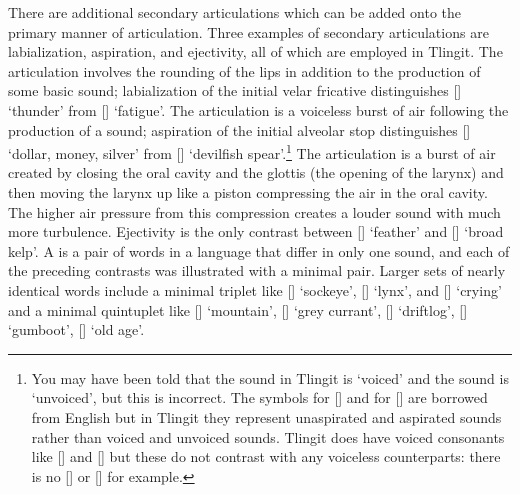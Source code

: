 There are additional secondary articulations which can be added onto the primary manner of articulation. Three examples of secondary articulations are labialization, aspiration, and ejectivity, all of which are employed in Tlingit. The  articulation involves the rounding of the lips in addition to the production of some basic sound; labialization of the initial velar fricative distinguishes  [] ‘thunder’ from  [] ‘fatigue’. The  articulation is a voiceless burst of air following the production of a sound; aspiration of the initial alveolar stop distinguishes  [] ‘dollar, money, silver’ from  [] ‘devilfish spear’.\footnote{You may have been told that the sound  in Tlingit is ‘voiced’ and the sound  is ‘unvoiced’, but this is incorrect. The symbols  for [] and  for [] are borrowed from English but in Tlingit they represent unaspirated and aspirated sounds rather than voiced and unvoiced sounds. Tlingit does have voiced consonants like  [] and  [] but these do not contrast with any voiceless counterparts: there is no [\!] or [] for example.} The  articulation is a burst of air created by closing the oral cavity and the glottis (the opening of the larynx) and then moving the larynx up like a piston compressing the air in the oral cavity. The higher air pressure from this compression creates a louder sound with much more turbulence. Ejectivity is the only contrast between  [] ‘feather’ and  [] ‘broad kelp’. A  is a pair of words in a language that differ in only one sound, and each of the preceding contrasts was illustrated with a minimal pair. Larger sets of nearly identical words include a minimal triplet like  [] ‘sockeye’,  [] ‘lynx’, and  [] ‘crying’ and a minimal quintuplet like  [] ‘mountain’,  [] ‘grey currant’,  [] ‘driftlog’,  [] ‘gumboot’,  [] ‘old age’.

